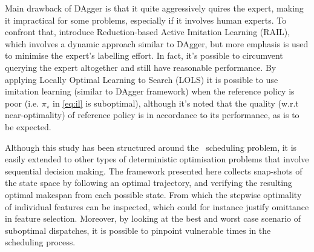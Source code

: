 \documentclass[smallextended]{svjour3}
\begin{document}
	Main drawback of DAgger is that it quite aggressively quires the expert, making 
	it impractical for some problems, especially if it involves human experts. 
	To confront that, \cite{Judah12} introduce Reduction-based Active Imitation 
	Learning (RAIL), which involves a dynamic approach similar to DAgger, but more 
	emphasis is used to minimise the expert's labelling effort.
	In fact, it's possible to circumvent querying the expert altogether and still 
	have reasonable performance. By applying Locally Optimal Learning to Search 
	(LOLS) \cite{ChangKADL15} it is possible to use imitation learning (similar to 
	DAgger framework) when the reference policy is poor (i.e. $\pi_\star$ in 
	\cref{eq:il} is suboptimal), 
	although it's noted that the quality (w.r.t near-optimality) of reference 
	policy is in accordance to its performance, as is to be expected. 
	
	Although this study has been structured around the \jsp\ scheduling problem, 
	it is easily extended to other types of deterministic optimisation problems 
	that involve sequential decision making. 
	The framework presented here collects snap-shots of the state space by 
	following an optimal trajectory, and verifying the resulting optimal makespan 
	from each possible state. 
	From which the stepwise optimality of individual features can be inspected, 
	which could for instance justify omittance in feature selection. 
	Moreover, by looking at the best and worst case scenario of suboptimal 
	dispatches, it is possible to pinpoint vulnerable times in the scheduling 
	process. 
	
	 
	  
	
\end{document}

